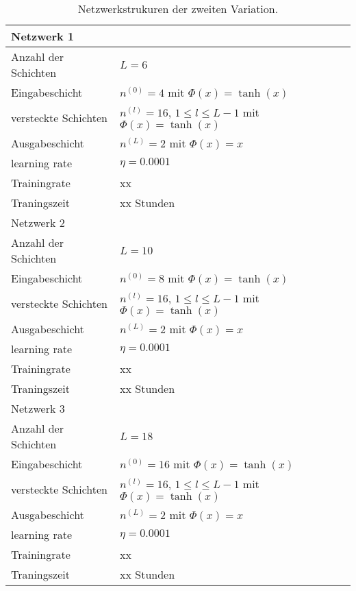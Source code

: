 \begin{table}
       \renewcommand{\arraystretch}{1.0}
       \centering
       \begin{tabular}{ l | l }
              \hline
              Netzwerk 1 & \\
              \hline
              Anzahl der Schichten & $L=6$ \\
              Eingabeschicht & $n^{(0)}=4$ mit $\Phi(x)=\tanh(x)$ \\
              versteckte Schichten & $n^{(l)}=16$, $1\leq l \leq L-1$ mit $\Phi(x)=\tanh(x)$ \\
              Ausgabeschicht & $n^{(L)}=2$ mit $\Phi(x)=x$ \\
              learning rate & $\eta=0.0001$ \\
              Trainingrate & xx \\
              Traningszeit & xx Stunden \\
              \hline
              Netzwerk 2 & \\
              \hline
              Anzahl der Schichten & $L=10$ \\
              Eingabeschicht & $n^{(0)}=8$ mit $\Phi(x)=\tanh(x)$ \\
              versteckte Schichten & $n^{(l)}=16$, $1\leq l \leq L-1$ mit $\Phi(x)=\tanh(x)$ \\
              Ausgabeschicht & $n^{(L)}=2$ mit $\Phi(x)=x$ \\
              learning rate & $\eta=0.0001$ \\
              Trainingrate & xx \\
              Traningszeit & xx Stunden \\
              \hline
              Netzwerk 3 & \\
              \hline
              Anzahl der Schichten & $L=18$ \\
              Eingabeschicht & $n^{(0)}=16$ mit $\Phi(x)=\tanh(x)$ \\
              versteckte Schichten & $n^{(l)}=16$, $1\leq l \leq L-1$ mit $\Phi(x)=\tanh(x)$ \\
              Ausgabeschicht & $n^{(L)}=2$ mit $\Phi(x)=x$ \\
              learning rate & $\eta=0.0001$ \\
              Trainingrate & xx \\
              Traningszeit & xx Stunden \\
              \hline
       \end{tabular}
       \caption{Netzwerkstrukuren der zweiten Variation.}
       \label{stiff-table-second}
\end{table}
